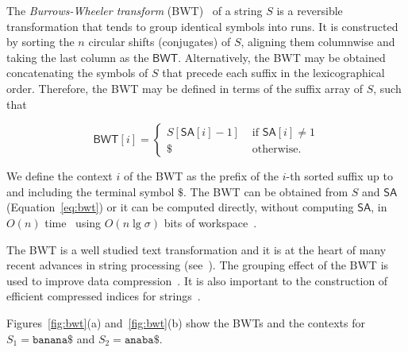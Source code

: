 \documentclass{elsarticle}
\newcommand{\SA}{\ensuremath{\mathsf{SA}}\xspace}
\newcommand{\BWT}{\ensuremath{\mathsf{BWT}}\xspace}
\begin{document}
The {\em Burrows-Wheeler transform} (BWT)~\cite{Burrows1994} of a string
$S$ is a reversible transformation that tends to group identical symbols into
runs.  It is constructed by sorting the $n$ circular shifts
(conjugates) of $S$, aligning them columnwise and taking the last
column as the \BWT.
Alternatively, the BWT may be obtained concatenating the symbols of $S$
that precede each suffix in the lexicographical order.  Therefore, the BWT
may be defined in terms of the suffix array of $S$, such that

\begin{equation}\label{eq:bwt}
\BWT[i]=
\begin{cases}
S[\SA[i]-1] & \mbox{ if }\SA[i]\neq 1\\
\$ & \mbox{ otherwise.}
\end{cases}
\end{equation}

We define the context $i$ of the BWT as the prefix of the $i$-th sorted
suffix up to and including the terminal symbol $\$$.  The BWT can be
obtained from $S$ and \SA (Equation~\ref{eq:bwt}) or it can be computed directly, without
computing \SA, in $O(n)$ time~\cite{Okanohara2009}
using $O(n \lg \sigma)$ bits of workspace~\cite{MunroNN17}.

The BWT is a well studied text transformation and it is at the heart of many recent advances in
string processing
(see~\cite{Adjeroh2008,Ohlebusch2013,Makinen2015,Navarro2016}).  The
grouping effect of the BWT is used to improve data
compression~\cite{MantaciRRSV17}.  It is also important to the construction
of efficient compressed indices for
strings~\cite{Ferragina2005,Navarro2007}.

Figures~\ref{fig:bwt}(a) and~\ref{fig:bwt}(b) show the BWTs and the contexts
for $S_1=\texttt{banana\$}$ and $S_2=\texttt{anaba\$}$.
\end{document}
